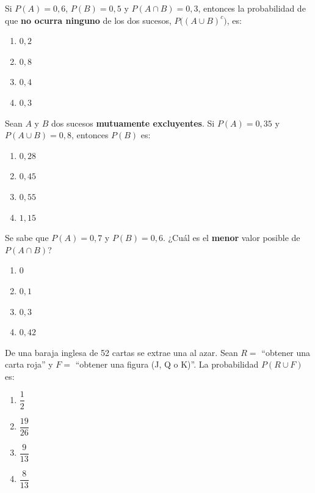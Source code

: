 \documentclass[12pt, a4paper]{article} %
\begin{document}
\begin{enumerate}[leftmargin=*]
    \begin{minipage}{\linewidth}
    \item Si $P(A) = 0{,}6$, $P(B) = 0{,}5$ y $P(A \cap B) = 0{,}3$, entonces la probabilidad de que \textbf{no ocurra ninguno} de los dos sucesos, $P\big((A \cup B)^c\big)$, es:
    \begin{enumerate}
        \item $0{,}2$
        \item $0{,}8$
        \item $0{,}4$
        \item $0{,}3$
    \end{enumerate}
    \end{minipage}
    \vspace{0.5cm}

    \begin{minipage}{\linewidth}
    \item Sean $A$ y $B$ dos sucesos \textbf{mutuamente excluyentes}. Si $P(A) = 0{,}35$ y $P(A \cup B) = 0{,}8$, entonces $P(B)$ es:
    \begin{enumerate}
        \item $0{,}28$
        \item $0{,}45$
        \item $0{,}55$
        \item $1{,}15$
    \end{enumerate}
    \end{minipage}
    \vspace{0.5cm}

    \begin{minipage}{\linewidth}
    \item Se sabe que $P(A) = 0{,}7$ y $P(B) = 0{,}6$. ¿Cuál es el \textbf{menor} valor posible de $P(A \cap B)$?
    \begin{enumerate}
        \item $0$
        \item $0{,}1$
        \item $0{,}3$
        \item $0{,}42$
    \end{enumerate}
    \end{minipage}
    \vspace{0.5cm}

    \begin{minipage}{\linewidth}
    \item De una baraja inglesa de 52 cartas se extrae una al azar. Sean $R = $ ``obtener una carta roja'' y $F = $ ``obtener una figura (J, Q o K)''. La probabilidad $P(R \cup F)$ es:
    \begin{enumerate}
        \item $\dfrac{1}{2}$
        \item $\dfrac{19}{26}$
        \item $\dfrac{9}{13}$
        \item $\dfrac{8}{13}$
    \end{enumerate}
    \end{minipage}

\end{enumerate}
\end{document}
